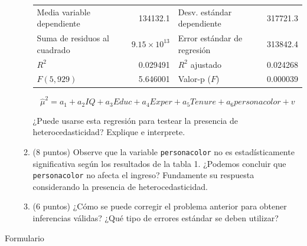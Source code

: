 \documentclass[10pt,a4paper]{article}
\begin{document}
\begin{enumerate}
\begin{enumerate}
\begin{center}
\vspace{1ex}
\begin{tabular}{lrlr}
Media variable dependiente & 134132.1 & Desv. estándar dependiente & 317721.3 \\
Suma de residuos al cuadrado & $9.15 \times 10^{13}$ & Error estándar de regresión & 313842.4 \\
$R^2$ & 0.029491 & $R^2$ ajustado & 0.024268 \\
$F(5, 929)$ & 5.646001 & Valor-p ($F$) & 0.000039 \\
\end{tabular}
\end{center}


    \[
    \hat{\mu}^2 = a_1 + a_2 IQ + a_3 Educ + a_4 Exper + a_5 Tenure + a_6 personacolor + v
    \]

    ¿Puede usarse esta regresión para testear la presencia de heterocedasticidad? Explique e interprete.

      \item (8 puntos) Observe que la variable \texttt{personacolor} no es estadísticamente significativa según los resultados de la tabla 1. ¿Podemos concluir que \texttt{personacolor} no afecta el ingreso? Fundamente su respuesta considerando la presencia de heterocedasticidad. 

        \item (6 puntos) ¿Cómo se puede corregir el problema anterior para obtener inferencias válidas? ¿Qué tipo de errores estándar se deben utilizar? 

   
\end{enumerate}

\end{enumerate}














\newpage


\begin{center}
    {\Large Formulario  }

 
\end{center}
\end{document}
